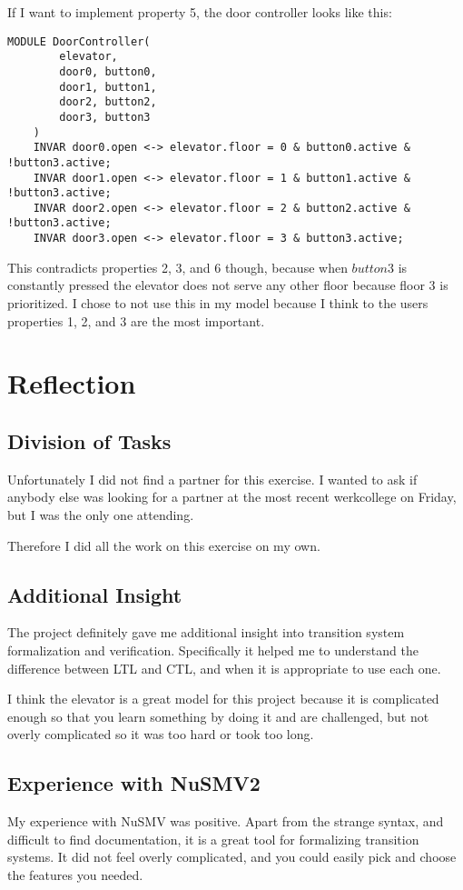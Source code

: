 \documentclass[12pt, a4paper]{article}
\begin{document}
If I want to implement property 5, the door controller looks like this:

\begin{lstlisting}[basicstyle=\small]
MODULE DoorController(
		elevator,
		door0, button0,
		door1, button1,
		door2, button2,
		door3, button3
	)
	INVAR door0.open <-> elevator.floor = 0 & button0.active & !button3.active;
	INVAR door1.open <-> elevator.floor = 1 & button1.active & !button3.active;
	INVAR door2.open <-> elevator.floor = 2 & button2.active & !button3.active;
	INVAR door3.open <-> elevator.floor = 3 & button3.active;
\end{lstlisting}

This contradicts properties 2, 3, and 6 though, because when $button3$ is constantly pressed the elevator does not serve any other floor because floor 3 is prioritized. I chose to not use this in my model because I think to the users properties 1, 2, and 3 are the most important.

\section{Reflection}
\subsection{Division of Tasks}
Unfortunately I did not find a partner for this exercise. I wanted to ask if anybody else was looking for a partner at the most recent werkcollege on Friday, but I was the only one attending.

Therefore I did all the work on this exercise on my own.

\subsection{Additional Insight}
The project definitely gave me additional insight into transition system formalization and verification. Specifically it helped me to understand the difference between LTL and CTL, and when it is appropriate to use each one.

I think the elevator is a great model for this project because it is complicated enough so that you learn something by doing it and are challenged, but not overly complicated so it was too hard or took too long.

\subsection{Experience with NuSMV2}
My experience with NuSMV was positive. Apart from the strange syntax, and difficult to find documentation, it is a great tool for formalizing transition systems. It did not feel overly complicated, and you could easily pick and choose the features you needed.
\end{document}
